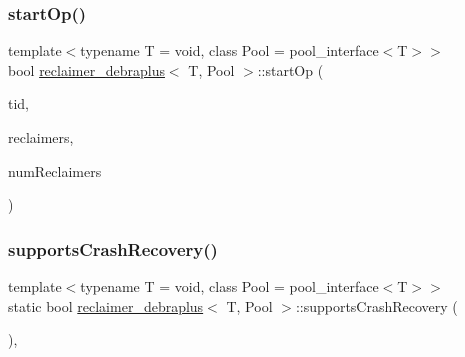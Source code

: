 \mbox{\label{classreclaimer__debraplus_ae6841e2253a106dafc3dfada360afce3}} 
\subsubsection{\texorpdfstring{start\+Op()}{startOp()}}
{\footnotesize\ttfamily template$<$typename T  = void, class Pool  = pool\+\_\+interface$<$\+T$>$$>$ \\
bool \hyperlink{classreclaimer__debraplus}{reclaimer\+\_\+debraplus}$<$ T, Pool $>$\+::start\+Op (\begin{DoxyParamCaption}\item[{const int}]{tid,  }\item[{void $\ast$const $\ast$const}]{reclaimers,  }\item[{const int}]{num\+Reclaimers }\end{DoxyParamCaption})\hspace{0.3cm}{\ttfamily [inline]}}

\mbox{\label{classreclaimer__debraplus_a13df7939ef9ba01add47fd3d3d76fb46}} 
\subsubsection{\texorpdfstring{supports\+Crash\+Recovery()}{supportsCrashRecovery()}}
{\footnotesize\ttfamily template$<$typename T  = void, class Pool  = pool\+\_\+interface$<$\+T$>$$>$ \\
static bool \hyperlink{classreclaimer__debraplus}{reclaimer\+\_\+debraplus}$<$ T, Pool $>$\+::supports\+Crash\+Recovery (\begin{DoxyParamCaption}{ }\end{DoxyParamCaption})\hspace{0.3cm}{\ttfamily [inline]}, {\ttfamily [static]}}

\mbox{\label{classreclaimer__debraplus_a2d27d53de5e35e26b12faf51b330ef13}} 
